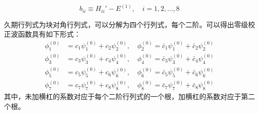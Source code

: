     \begin{equation*}
        b_{ii} \equiv H_{ii}' - E^{\left(1\right)}, \quad i = 1,2,\ldots,8
    \end{equation*}

    久期行列式为块对角行列式，可以分解为四个行列式，每个二阶。可以得出零级校正波函数具有如下形式：
    \begin{equation}
        \begin{aligned}
            \phi_1^{\left(0\right)} &= c_1\psi_1^{\left(0\right)} + c_2\psi_2^{\left(0\right)}, \quad \phi_2^{\left(0\right)} = \bar{c}_1\psi_1^{\left(0\right)} + \bar{c}_2\psi_2^{\left(0\right)} \\
            \phi_3^{\left(0\right)} &= c_3\psi_3^{\left(0\right)} + c_4\psi_4^{\left(0\right)}, \quad \phi_4^{\left(0\right)} = \bar{c}_3\psi_3^{\left(0\right)} + \bar{c}_4\psi_4^{\left(0\right)} \\
            \phi_5^{\left(0\right)} &= c_5\psi_5^{\left(0\right)} + c_6\psi_6^{\left(0\right)}, \quad \phi_6^{\left(0\right)} = \bar{c}_5\psi_5^{\left(0\right)} + \bar{c}_6\psi_6^{\left(0\right)} \\
            \phi_7^{\left(0\right)} &= c_7\psi_7^{\left(0\right)} + c_8\psi_8^{\left(0\right)}, \quad \phi_8^{\left(0\right)} = \bar{c}_7\psi_7^{\left(0\right)} + \bar{c}_8\psi_8^{\left(0\right)}
        \end{aligned}
        \label{eq:9.94}
    \end{equation}
    其中，未加横杠的系数对应于每个二阶行列式的一个根，加横杠的系数对应于第二个根。

